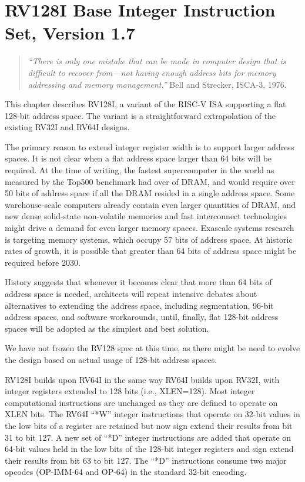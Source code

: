\chapter{RV128I Base Integer Instruction Set, Version 1.7}
\label{rv128}

\begin{quote}
{\em ``There is only one mistake that can be made in computer design that is
difficult to recover from---not having enough address bits for memory
addressing and memory management.''} Bell and Strecker, ISCA-3, 1976.
\end{quote}

This chapter describes RV128I, a variant of the RISC-V ISA
supporting a flat 128-bit address space.  The variant is a
straightforward extrapolation of the existing RV32I and RV64I designs.

\begin{commentary}
The primary reason to extend integer register width is to support
larger address spaces.  It is not clear when a flat address space larger
than 64 bits will be required.  At the time of writing, the fastest
supercomputer in the world as measured by the Top500 benchmark had
over  of DRAM, and would require over 50 bits of address
space if all the DRAM resided in a single address space.  Some
warehouse-scale computers already contain even larger quantities of
DRAM, and new dense solid-state non-volatile memories and fast
interconnect technologies might drive a demand for even larger memory
spaces.  Exascale systems research is targeting 
memory systems, which occupy 57 bits of address space.  At historic
rates of growth, it is possible that greater than 64 bits of address
space might be required before 2030.

History suggests that whenever it becomes clear that more than 64 bits
of address space is needed, architects will repeat intensive debates
about alternatives to extending the address space, including
segmentation, 96-bit address spaces, and software workarounds, until,
finally, flat 128-bit address spaces will be adopted as the simplest
and best solution.

We have not frozen the RV128 spec at this time, as there might be need
to evolve the design based on actual usage of 128-bit address spaces.
\end{commentary}

RV128I builds upon RV64I in the same way RV64I builds upon RV32I, with
integer registers extended to 128 bits (i.e., XLEN=128).  Most integer
computational instructions are unchanged as they are defined to
operate on XLEN bits.  The RV64I ``*W'' integer instructions that
operate on 32-bit values in the low bits of a register are retained
but now sign extend their results from bit 31 to bit 127. A new set of
``*D'' integer instructions are added that operate on 64-bit values
held in the low bits of the 128-bit integer registers and sign extend
their results from bit 63 to bit 127.  The ``*D'' instructions consume
two major opcodes (OP-IMM-64 and OP-64) in the standard 32-bit
encoding.

